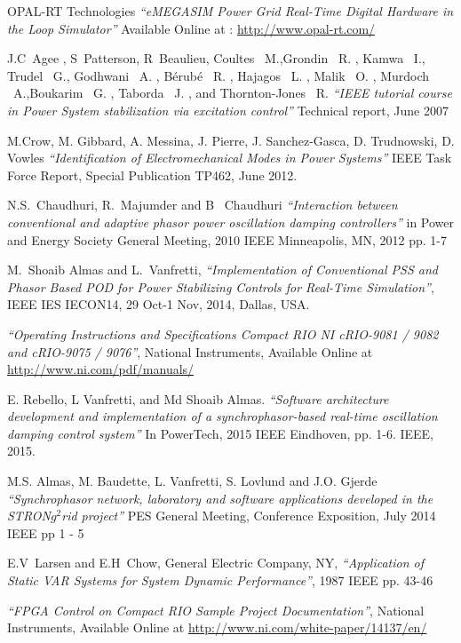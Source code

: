 \documentclass{ieeeaccess}
\begin{document}
\begin{thebibliography}{00}
OPAL-RT Technologies \emph{``eMEGASIM Power Grid Real-Time Digital Hardware in the Loop Simulator''} Available Online at : \underline{http://www.opal-rt.com/}

 J.C~Agee , S~Patterson, R~Beaulieu, Coultes \ M.,Grondin \ R. , Kamwa \ I.,
Trudel \ G., Godhwani \ A. , Bérubé \ R. , Hajagos \ L. , Malik \ O. , Murdoch \ A.,Boukarim \ G. , Taborda \ J. , and Thornton-Jones \ R. \emph{``IEEE tutorial course in Power System stabilization via excitation control''} Technical report, June 2007


 M.Crow, M. Gibbard, A. Messina, J. Pierre, J. Sanchez-Gasca, D. Trudnowski, D. Vowles \emph{``Identification of Electromechanical Modes in Power Systems''} IEEE Task Force Report, Special Publication TP462, June 2012.

 N.S.~Chaudhuri, R.~Majumder and B~ Chaudhuri \emph{``Interaction between conventional and adaptive phasor power oscillation damping controllers''} in Power and Energy Society General Meeting, 2010 IEEE Minneapolis, MN, 2012 pp. 1-7
  
 M.~Shoaib Almas and L.~Vanfretti, \emph{``Implementation of Conventional PSS and Phasor Based POD for Power Stabilizing Controls for Real-Time Simulation''}, IEEE IES IECON14, 29 Oct-1 Nov, 2014, Dallas, USA.

 \emph{``Operating Instructions and Specifications Compact RIO NI cRIO-9081 / 9082 and cRIO-9075 / 9076''}, National Instruments, Available Online at \underline{http://www.ni.com/pdf/manuals/}

E. Rebello, L Vanfretti, and Md Shoaib Almas. \emph{``Software architecture development and implementation of a synchrophasor-based real-time oscillation damping control system''} In PowerTech, 2015 IEEE Eindhoven, pp. 1-6. IEEE, 2015.

 M.S. Almas, M. Baudette, L. Vanfretti, S. Lovlund and J.O. Gjerde \emph{``Synchrophasor network, laboratory and software applications developed in the STRON$g^{2}$rid project''} PES General Meeting, Conference Exposition, July 2014 IEEE pp 1 - 5

 E.V~Larsen and E.H~Chow, General Electric Company, NY, \emph{``Application of Static VAR Systems for System Dynamic Performance''}, 1987 IEEE pp. 43-46

 \emph{``FPGA Control on Compact RIO Sample Project Documentation''}, National Instruments, Available Online at \underline{http://www.ni.com/white-paper/14137/en/}



\end{thebibliography}
\end{document}
